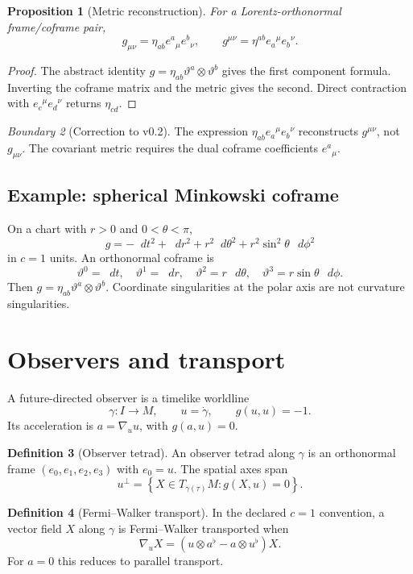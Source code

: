 \documentclass[11pt,a4paper]{article}
\theoremstyle{definition}
\newtheorem{definition}{Definition}[section]
\theoremstyle{plain}
\newtheorem{proposition}[definition]{Proposition}
\theoremstyle{remark}
\newtheorem{warning}[definition]{Boundary}
\newcommand{\dd}{\mathop{}\!d}
\newcommand{\set}[1]{\left\{#1\right\}}
\begin{document}
\begin{proposition}[Metric reconstruction]
For a Lorentz-orthonormal frame/coframe pair,
\[
\boxed{
g_{\mu\nu}
=\eta_{ab}e^a{}_\mu e^b{}_\nu,
\qquad
g^{\mu\nu}
=\eta^{ab}e_a{}^\mu e_b{}^\nu.
}
\]
\end{proposition}
\begin{proof}
The abstract identity
$g=\eta_{ab}\vartheta^a\otimes\vartheta^b$ gives the first component
formula. Inverting the coframe matrix and the metric gives the second.
Direct contraction with $e_c{}^\mu e_d{}^\nu$ returns $\eta_{cd}$.
\end{proof}

\begin{warning}[Correction to v0.2]
The expression $\eta_{ab}e_a{}^\mu e_b{}^\nu$ reconstructs
$g^{\mu\nu}$, not $g_{\mu\nu}$. The covariant metric requires the dual
coframe coefficients $e^a{}_\mu$.
\end{warning}

\subsection{Example: spherical Minkowski coframe}

On a chart with $r>0$ and $0<\theta<\pi$,
\[
g=-\dd t^2+\dd r^2+r^2\dd\theta^2
+r^2\sin^2\theta\,\dd\phi^2
\]
in $c=1$ units. An orthonormal coframe is
\[
\vartheta^0=\dd t,\quad
\vartheta^1=\dd r,\quad
\vartheta^2=r\,\dd\theta,\quad
\vartheta^3=r\sin\theta\,\dd\phi.
\]
Then $g=\eta_{ab}\vartheta^a\otimes\vartheta^b$. Coordinate singularities
at the polar axis are not curvature singularities.

\section{Observers and transport}

A future-directed observer is a timelike worldline
\[
\gamma:I\to M,\qquad
u=\dot\gamma,\qquad
g(u,u)=-1.
\]
Its acceleration is $a=\nabla_u u$, with $g(a,u)=0$.

\begin{definition}[Observer tetrad]
An observer tetrad along $\gamma$ is an orthonormal frame
$(e_0,e_1,e_2,e_3)$ with $e_0=u$. The spatial axes span
\[
u^\perp=\set{X\in T_{\gamma(\tau)}M:g(X,u)=0}.
\]
\end{definition}

\begin{definition}[Fermi--Walker transport]
In the declared $c=1$ convention, a vector field $X$ along $\gamma$ is
Fermi--Walker transported when
\[
\nabla_uX
=\left(u\otimes a^\flat-a\otimes u^\flat\right)X.
\]
For $a=0$ this reduces to parallel transport.
\end{definition}
\end{document}
